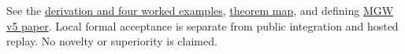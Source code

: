\documentclass[11pt,a4paper]{article}
\begin{document}
See the \href{https://github.com/sepahead/pid-rs/blob/main/audit/formal/lean-prefix-mgw-bias/EXPOSITION.md}{derivation and four worked examples}, \href{https://github.com/sepahead/pid-rs/blob/main/audit/formal/lean-prefix-mgw-bias/THEOREM_MAP.md}{theorem map}, and defining \href{https://arxiv.org/abs/2002.03356v5}{MGW v5 paper}. Local formal acceptance is separate from public integration and hosted replay. No novelty or superiority is claimed.
\end{document}
